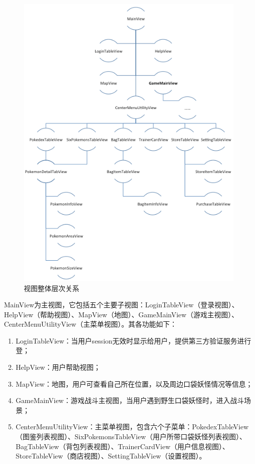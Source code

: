 \documentclass{article}
\begin{document}
\begin{CJK}{UTF8}{gbsn}
  \begin{figure}[htbp]
		\centering
		\includegraphics[bb=0 0 506 667, scale=0.45]{figure/fig_n10.png}
		\caption{视图整体层次关系}
		\label{fig:n10}
	\end{figure}

  MainView为主视图，它包括五个主要子视图：LoginTableView（登录视图）、HelpView（帮助视图）、MapView（地图）、GameMainView（游戏主视图）、CenterMenuUtilityView（主菜单视图）。其各功能如下：

  \begin{enumerate}
		\item LoginTableView：当用户session无效时显示给用户，提供第三方验证服务进行登；
		\item HelpView：用户帮助视图；
		\item MapView：地图，用户可查看自己所在位置，以及周边口袋妖怪情况等信息；
		\item GameMainView：游戏战斗主视图，当用户遇到野生口袋妖怪时，进入战斗场景；
		\item CenterMenuUtilityView：主菜单视图，包含六个子菜单：PokedexTableView（图鉴列表视图）、SixPokemonsTableView（用户所带口袋妖怪列表视图）、BagTableView（背包列表视图）、TrainerCardView（用户信息视图）、StoreTableView（商店视图）、SettingTableView（设置视图）。
  \end{enumerate}


\end{CJK}
\end{document}
